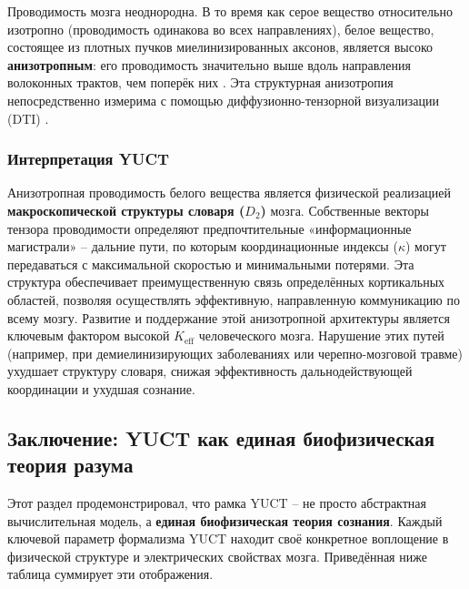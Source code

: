 \documentclass[12pt,a4paper]{article}
\begin{document}
	Проводимость мозга неоднородна. В то время как серое вещество относительно изотропно (проводимость одинакова во всех направлениях), белое вещество, состоящее из плотных пучков миелинизированных аксонов, является высоко \textbf{анизотропным}: его проводимость значительно выше вдоль направления волоконных трактов, чем поперёк них \cite{Tuch2001}. Эта структурная анизотропия непосредственно измерима с помощью диффузионно-тензорной визуализации (DTI) \cite{Wu2018}.
	
	\subsubsection*{Интерпретация YUCT}
	Анизотропная проводимость белого вещества является физической реализацией \textbf{макроскопической структуры словаря (\(D_2\))} мозга. Собственные векторы тензора проводимости определяют предпочтительные «информационные магистрали» – дальние пути, по которым координационные индексы (\(\kappa\)) могут передаваться с максимальной скоростью и минимальными потерями. Эта структура обеспечивает преимущественную связь определённых кортикальных областей, позволяя осуществлять эффективную, направленную коммуникацию по всему мозгу. Развитие и поддержание этой анизотропной архитектуры является ключевым фактором высокой \(K_{\mathrm{eff}}\) человеческого мозга. Нарушение этих путей (например, при демиелинизирующих заболеваниях или черепно-мозговой травме) ухудшает структуру словаря, снижая эффективность дальнодействующей координации и ухудшая сознание.
	
	\subsection{Заключение: YUCT как единая биофизическая теория разума}
	
	Этот раздел продемонстрировал, что рамка YUCT – не просто абстрактная вычислительная модель, а \textbf{единая биофизическая теория сознания}. Каждый ключевой параметр формализма YUCT находит своё конкретное воплощение в физической структуре и электрических свойствах мозга. Приведённая ниже таблица суммирует эти отображения.
	
\end{document}
